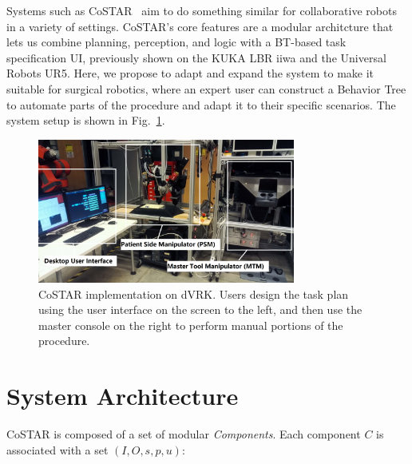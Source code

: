 \documentclass[letterpaper, 10 pt, conference]{ieeeconf}
\begin{document}


Systems such as CoSTAR~\cite{paxton2017costar} aim to do something similar for collaborative robots in a variety of settings. 
CoSTAR's core features are a modular architcture that lets us combine planning, perception, and logic with a BT-based task specification UI, previously shown on the KUKA LBR iiwa and the Universal Robots UR5. Here, we propose to adapt and expand the system to make it suitable for surgical robotics, where an expert user can construct a Behavior Tree to automate parts of the procedure and adapt it to their specific scenarios.
The system setup is shown in Fig.~\ref{fig:dvrk}. 

\begin{figure}[bt]
\centering
\includegraphics[width=240pt]{dvrk.png}
\caption{CoSTAR implementation on dVRK. Users design the task plan using the user interface on the screen to the left, and then use the master console on the right to perform manual portions of the procedure.}
\label{fig:dvrk}
\end{figure}


\section{System Architecture}
CoSTAR is composed of a set of modular \textit{Components}. Each component $C$ is associated with a set $(I,O,s,p,u)$: 
\end{document}
